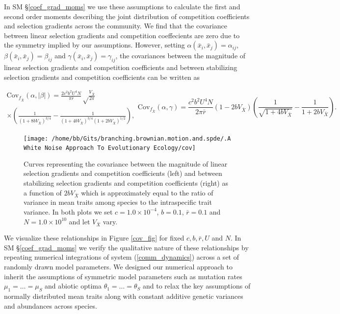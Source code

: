 \documentclass[]{elsarticle} %
\begin{document}
In SM \S\ref{coef_grad_moms} we use these assumptions to calculate the
first and second order moments describing the joint distribution of
competition coefficients and selection gradients across the community.
We find that the covariance between linear selection gradients and
competition coeffecients are zero due to the symmetry implied by our
assumptions. However, setting \(\alpha(\bar x_i,\bar x_j)=\alpha_{ij}\),
\(\beta(\bar x_i,\bar x_j)=\beta_{ij}\) and
\(\gamma(\bar x_i,\bar x_j)=\gamma_{ij}\), the covariances between the
magnitude of linear selection gradients and competition coefficients and
between stabilizing selection gradients and competition coefficients can
be written as

\begin{subequations}\label{cov_eqns}
\begin{multline}\label{cov_alpha_beta}
\mathrm{Cov}_{f_{\bar X}}(\alpha,|\beta|)=\frac{2c^2b^2U^4N}{\pi\bar r}\sqrt\frac{V_{\bar X}}{2\pi} \\
\times\left(\frac{1}{(1+8bV_{\bar X})^{3/4}}-\frac{1}{(1+4bV_{\bar X})^{3/4}(1+2bV_{\bar X})^{1/2}}\right),
\end{multline}
\begin{equation}\label{cov_alpha_gamma}
\mathrm{Cov}_{f_{\bar X}}(\alpha,\gamma)=\frac{c^2b^2U^4N}{2\pi\bar r}(1-2bV_{\bar X})\left(\frac{1}{\sqrt{1+4bV_{\bar X}}}-\frac{1}{1+2bV_{\bar X}}\right).
\end{equation}
\end{subequations}

\begin{figure}

{\centering \texttt{[image: /home/bb/Gits/branching.brownian.motion.and.spde/.A White Noise Approach To Evolutionary Ecology/cov]} 

}

\caption{\label{cov_fig}Curves representing the covariance between the magnitude of linear selection gradients and competition coefficients (left) and between stabilizing selection gradients and competition coefficients (right) as a function of $2bV_{\bar X}$ which is approximately equal to the ratio of variance in mean traits among species to the intraspecific trait variance. In both plots we set $c=1.0\times10^{-4}$, $b=0.1$, $\bar r=0.1$ and $N=1.0\times10^{10}$ and let $V_{\bar X}$ vary.}\label{fig:unnamed-chunk-10}
\end{figure}

We visualize these relationships in Figure \ref{cov_fig} for fixed
\(c,b,\bar r,U\) and \(N\). In SM \S\ref{coef_grad_moms} we verify the
qualitative nature of these relationships by repeating numerical
integrations of system (\ref{comm_dynamics}) across a set of randomly
drawn model parameters. We designed our numerical approach to inherit
the assumptions of symmetric model parameters such as mutation rates
\(\mu_1=\dots=\mu_S\) and abiotic optima \(\theta_1=\dots=\theta_S\) and
to relax the key assumptions of normally distributed mean traits along
with constant additive genetic variances and abundances across species.
\end{document}
